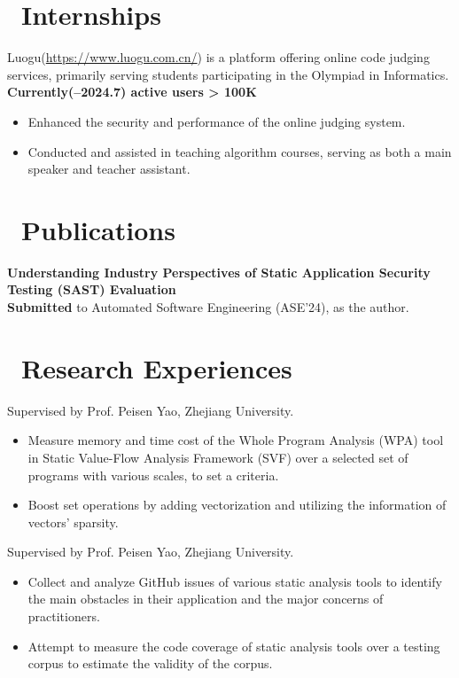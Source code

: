 \documentclass{resume}
\begin{document}
\section{\faUsers\ Internships}
Luogu(\href{https://www.luogu.com.cn/}{https://www.luogu.com.cn/}) is a platform offering online code judging services, primarily serving students participating in the Olympiad in Informatics.\\
\textbf{Currently(--2024.7) active users > 100K}
\begin{itemize}
  \item Enhanced the security and performance of the online judging system.
  \item Conducted and assisted in teaching algorithm courses, serving as both a main speaker and teacher assistant.
\end{itemize}

\section{\faBookmarkO\ Publications}
\textbf{Understanding Industry Perspectives of Static Application Security Testing (SAST) Evaluation}\\
\textbf{Submitted} to Automated Software Engineering (ASE'24), as the  author.

\section{\faSearch\ Research Experiences}
Supervised by Prof. Peisen Yao, Zhejiang University.
\begin{itemize}
  \item Measure memory and time cost of the Whole Program Analysis (WPA) tool in Static Value-Flow Analysis Framework (SVF) over a selected set of programs with various scales, to set a criteria.
  \item Boost set operations by adding vectorization and utilizing the information of vectors' sparsity.
\end{itemize}

Supervised by Prof. Peisen Yao, Zhejiang University.
\begin{itemize}
  \item Collect and analyze GitHub issues of various static analysis tools to identify the main obstacles in their application and the major concerns of practitioners.
  \item Attempt to measure the code coverage of static analysis tools over a testing corpus to estimate the validity of the corpus.
\end{itemize}
\end{document}
